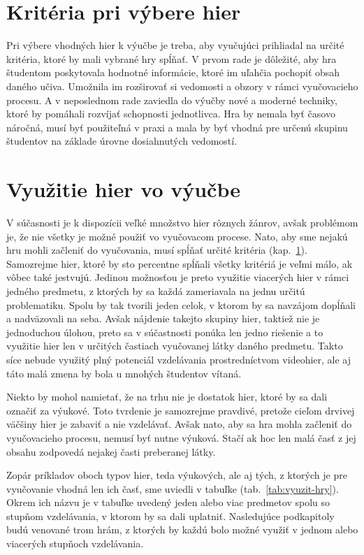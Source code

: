 \documentclass[10pt,twoside,slovak,a4paper]{article}
\begin{document}
\section{Kritéria pri výbere hier} \label{kriteria}

Pri výbere vhodných hier k výučbe je treba, aby vyučujúci prihliadal na určité kritéria, ktoré by mali vybrané hry spĺňať. V prvom rade je dôležité, aby hra študentom poskytovala hodnotné informácie, ktoré im uľahčia pochopiť obsah daného učiva. Umožnila im rozširovať si vedomosti a obzory v rámci vyučovacieho procesu. A v neposlednom rade zaviedla do výučby nové a moderné techniky, ktoré by pomáhali rozvíjať schopnosti jednotlivca. Hra by nemala byť časovo náročná, musí byť použiteľná v praxi a mala by byť vhodná pre určenú skupinu študentov na základe úrovne dosiahnutých vedomostí.

\section{Využitie hier vo výučbe} \label{vyuzitie}

V súčasnosti je k dispozícii veľké množstvo hier rôznych žánrov, avšak problémom je, že nie všetky je možné použiť vo vyučovacom procese. Nato, aby sme nejakú hru mohli začleniť do vyučovania, musí spĺňať určité kritéria (kap.~\ref{kriteria}). Samozrejme hier, ktoré by sto percentne spĺňali všetky kritériá je veľmi málo, ak vôbec také jestvujú. Jedinou možnosťou je preto využitie viacerých hier v rámci jedného predmetu, z ktorých by sa každá zameriavala na jednu určitú problematiku. Spolu by tak tvorili jeden celok, v ktorom by sa navzájom dopĺňali a nadväzovali na seba. Avšak nájdenie takejto skupiny hier, taktiež nie je jednoduchou úlohou, preto sa v súčastnosti ponúka len jedno riešenie a to využitie hier len v určitých častiach vyučovanej látky daného predmetu. Takto síce nebude využitý plný potenciál vzdelávania prostredníctvom videohier, ale aj táto malá zmena by bola u mnohých študentov vítaná. 

Niekto by mohol namietať, že na trhu nie je dostatok hier, ktoré by sa dali označiť za výukové. Toto tvrdenie je samozrejme pravdivé, pretože cieľom drvivej väčšiny hier je zabaviť a nie vzdelávať. Avšak nato, aby sa hra mohla začleniť do vyučovacieho procesu, nemusí byť nutne výuková. Stačí ak hoc len malá časť z jej obsahu zodpovedá nejakej časti preberanej látky\cite{Videohry}. 

Zopár príkladov oboch typov hier, teda výukových, ale aj tých, z ktorých je pre vyučovanie vhodná len ich časť, sme uviedli v tabuľke (tab.~\ref{tab:vyuzit-hry}). Okrem ich názvu je v tabuľke uvedený jeden alebo viac predmetov spolu so stupňom vzdelávania, v ktorom by sa dali uplatniť. Nasledujúce podkapitoly budú venované trom hrám, z ktorých by každú bolo možné využiť v jednom alebo viacerých stupňoch vzdelávania.
\end{document}
